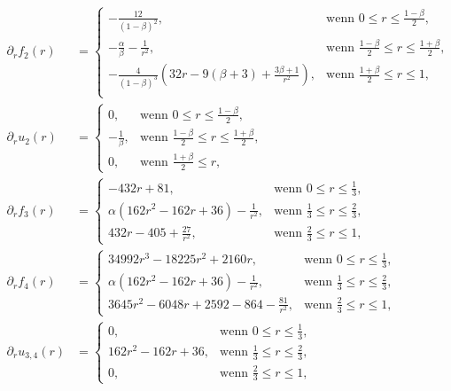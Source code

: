 \begin{align*}
  \partial_r f_2(r) &= 
  \begin{cases}
    -\frac{12}{(1-\beta)^2},&\text{wenn }0\leq r\leq\frac{1-\beta}{2},\\
    -\frac{\alpha}{\beta}-\frac{1}{r^2},&
    \text{wenn } \frac{1-\beta}{2}\leq r\leq \frac{1+\beta}{2},\\
    -\frac{4}{(1-\beta)^3}\left( 32r-9(\beta+3)+\frac{3\beta+1}{r^2} \right),&
    \text{wenn } \frac{1+\beta}{2}\leq r\leq 1,\\
  \end{cases}\\
  \partial_r u_2(r) &= 
  \begin{cases}
    0,&\text{wenn }0\leq r\leq\frac{1-\beta}{2},\\
    -\frac{1}{\beta},&
    \text{wenn } \frac{1-\beta}{2}\leq r\leq \frac{1+\beta}{2},\\
    0,&\text{wenn } \frac{1+\beta}{2}\leq r,
  \end{cases}\\
  \partial_r f_3(r) &=
  \begin{cases}
    - 432r + 81, & \text{wenn } 0\leq r\leq\frac{1}{3},\\
    \alpha\left(162r^2 - 162r + 36\right) - \frac{1}{r^2}, & 
    \text{wenn } \frac{1}{3}\leq r\leq \frac{2}{3},\\
    432r - 405 + \frac{27}{r^2}, & 
    \text{wenn } \frac{2}{3}\leq r\leq 1,
  \end{cases}\\
  \partial_r f_4(r) &=
  \begin{cases}
    34992r^3 - 18225r^2 + 2160r, & \text{wenn } 0\leq r\leq\frac{1}{3},\\
    \alpha\left(162r^2 - 162r + 36\right) - \frac{1}{r^2}, & 
    \text{wenn } \frac{1}{3}\leq r\leq \frac{2}{3},\\
    3645r^2 - 6048r + 2592 - 864 - \frac{81}{r^2}, & 
    \text{wenn } \frac{2}{3}\leq r\leq 1,
  \end{cases}\\
  \partial_r u_{3,4}(r) &=
  \begin{cases}
    0, & \text{wenn } 0\leq r\leq\frac{1}{3},\\
    162r^2 - 162r + 36, & 
    \text{wenn } \frac{1}{3}\leq r\leq \frac{2}{3},\\
    0, & \text{wenn } \frac{2}{3}\leq r\leq 1,
  \end{cases}\\
\end{align*}

